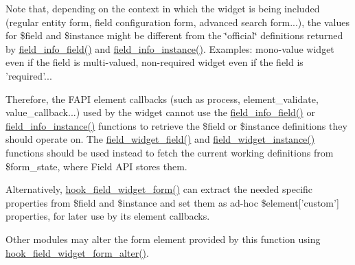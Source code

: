 Note that, depending on the context in which the widget is being included (regular entity form, field configuration form, advanced search form...), the values for \$field and \$instance might be different from the \char`\"{}official\char`\"{} definitions returned by \hyperlink{group__field__info_ga74cfc942cd2baa5c49780b08c5d357d4}{field\_\-info\_\-field()} and \hyperlink{group__field__info_ga7d4361ece7a9a8be980e3fd4a6307564}{field\_\-info\_\-instance()}. Examples: mono-\/value widget even if the field is multi-\/valued, non-\/required widget even if the field is 'required'...

Therefore, the FAPI element callbacks (such as process, element\_\-validate, value\_\-callback...) used by the widget cannot use the \hyperlink{group__field__info_ga74cfc942cd2baa5c49780b08c5d357d4}{field\_\-info\_\-field()} or \hyperlink{group__field__info_ga7d4361ece7a9a8be980e3fd4a6307564}{field\_\-info\_\-instance()} functions to retrieve the \$field or \$instance definitions they should operate on. The \hyperlink{field_8form_8inc_a71dcef632fc59641eee5238c7c6b335c}{field\_\-widget\_\-field()} and \hyperlink{field_8form_8inc_ac72e1f5dacbab488a337f79fe485429f}{field\_\-widget\_\-instance()} functions should be used instead to fetch the current working definitions from \$form\_\-state, where Field API stores them.

Alternatively, \hyperlink{group__field__widget_gaa9b0e55fd0eb57ac0f9c7c30d251971b}{hook\_\-field\_\-widget\_\-form()} can extract the needed specific properties from \$field and \$instance and set them as ad-\/hoc \$element\mbox{[}'custom'\mbox{]} properties, for later use by its element callbacks.

Other modules may alter the form element provided by this function using \hyperlink{group__field__widget_gaca9d517ab0584fa2428779d8aa24a441}{hook\_\-field\_\-widget\_\-form\_\-alter()}.



